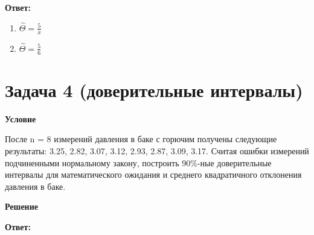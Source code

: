 \documentclass[a4paper,14pt]{extreport} %
\begin{document}
\hfill

\textbf{Ответ:}

\begin{enumerate}
\item $\hat \Theta = \frac{5}{\overline x}$
\item $\hat \Theta =\frac{5}{6}$
\end{enumerate}

\section{Задача 4 (доверительные интервалы)}

\hfill

\textbf{Условие}

После n = 8 измерений давления в баке с горючим получены следующие результаты: 3.25, 2.82, 3.07, 3.12, 2.93, 2.87, 3.09, 3.17. Считая ошибки измерений подчиненными нормальному закону, построить 90\%-ные доверительные интервалы для математического ожидания и среднего квадратичного отклонения давления в баке.

\hfill

\textbf{Решение}

\hfill

\textbf{Ответ:}
\end{document}

